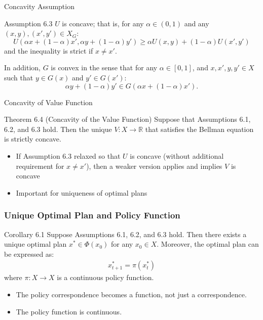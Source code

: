 \documentclass[9pt,aspectratio=169]{beamer}
\newcommand{\R}{\mathbb{R}}
\begin{document}
\begin{frame}{Concavity Assumption}
\begin{block}{Assumption 6.3}
    $U$ is concave; that is, for any $\alpha \in (0,1)$ and any $(x,y),
    (x',y') \in X_G$:
    \begin{equation*}
        U(\alpha x + (1-\alpha)x', \alpha y + (1-\alpha)y') \geq \alpha
        U(x,y) + (1-\alpha)U(x',y')
    \end{equation*}
    and the inequality is strict if $x \neq x'$.

    In addition, $G$ is convex in the sense that for any $\alpha \in [0,1]$,
    and $x, x', y, y' \in X$ such that $y \in G(x)$ and $y' \in G(x')$:
    \begin{equation*}
        \alpha y + (1-\alpha)y' \in G(\alpha x + (1-\alpha)x').
    \end{equation*}
\end{block}
\end{frame}

\begin{frame}{Concavity of Value Function}
\begin{block}{Theorem 6.4 (Concavity of the Value Function)}
Suppose that Assumptions 6.1, 6.2, and 6.3 hold. Then the unique $V: X \to \R$ that satisfies the Bellman equation is strictly concave.
\end{block}

\begin{itemize}
    \item If Assumption 6.3 relaxed so that $U$ is concave (without
    additional requirement for $x \neq x'$), then a weaker version applies and
    implies $V$ is concave
    \item Important for uniqueness of optimal plans
\end{itemize}

\end{frame}

\begin{frame}
    \frametitle{Unique Optimal Plan and Policy Function}
\begin{block}{Corollary 6.1}
Suppose Assumptions 6.1, 6.2, and 6.3 hold. Then there exists a unique optimal plan $x^* \in \Phi(x_0)$ for any $x_0 \in X$. Moreover, the optimal plan can be expressed as:
\begin{align*}
x^*_{t+1} = \pi(x^*_t)
\end{align*}
where $\pi: X \to X$ is a continuous policy function.
\end{block}

\begin{itemize}
    \item The policy correspondence becomes a function, not just a
    correspondence.
    \item The policy function is continuous.
\end{itemize}

\end{frame}
\end{document}
